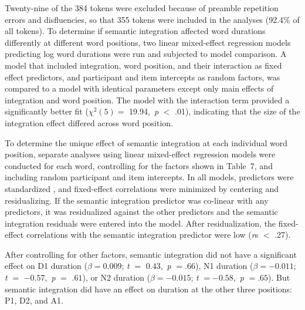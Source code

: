 \documentclass[12pt,titlepage]{article}
\begin{document}
Twenty-nine of the 384 tokens were excluded because of preamble repetition errors and disfluencies, so that 355 tokens were included in the analyses (92.4\% of all tokens). To determine if semantic integration affected word durations differently at different word positions, two linear mixed-effect regression models predicting log word durations were run and subjected to model comparison.  A model that included integration, word position, and their interaction as fixed effect predictors, and participant and item intercepts as random factors, was compared to a model with identical parameters except only main effects of integration and word position.  The model with the interaction term provided a significantly better fit ($\chi^{2}(5) =$ 19.94,~\textit{p} $<$ .01), indicating that the size of the integration effect differed across word position. 

 To determine the unique effect of semantic integration at each individual word position, separate analyses using linear mixed-effect regression models were conducted for each word, controlling for the factors shown in Table~7, and including random participant and item intercepts.  In all models, predictors were standardized \cite{GelmanHill07}, and fixed-effect correlations were minimized by centering and residualizing. If the semantic integration predictor was co-linear with any predictors, it was residualized against the other predictors and the semantic integration residuals were entered into the model.  After residualization, the fixed-effect correlations with the semantic integration predictor were low (\textit{r}s $<$ .27).  
 
 After controlling for other factors, semantic integration did not have a significant effect on D1 duration ($\beta = 0.009$; \textit{t} $=$ $0.43$,~\textit{p} $=$$.66$), N1 duration ($\beta =  -0.011$; \textit{t} $=$ $-0.57$,~\textit{p} $=$ $.61$), or N2 duration ($\beta = - 0.015$; \textit{t} $=$$ -0.58$,~\textit{p} $=$$.65$). But semantic integration did have an effect on duration at the other three positions:  P1, D2, and A1.


 

\end{document}
